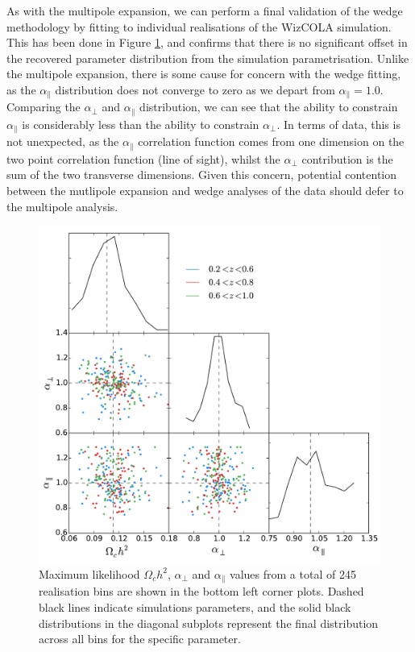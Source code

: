 \documentclass[titlesmallcaps, examinerscopy, copyrightpage]{uqthesis}
\begin{document}
As with the multipole expansion, we can perform a final validation of the wedge methodology by fitting to individual realisations of the WizCOLA simulation. This has been done in Figure \ref{fig:wdgDist2}, and confirms that there is no significant offset in the recovered parameter distribution from the simulation parametrisation. Unlike the multipole expansion, there is some cause for concern with the wedge fitting, as the $\alpha_\parallel$ distribution does not converge to zero as we depart from $\alpha_\parallel = 1.0$. Comparing the $\alpha_\perp$ and $\alpha_\parallel$ distribution, we can see that the ability to constrain $\alpha_\parallel$ is considerably less than the ability to constrain $\alpha_\perp$. In terms of data, this is not unexpected, as the $\alpha_\parallel$ correlation function comes from one dimension on the two point correlation function (line of sight), whilst the $\alpha_\perp$ contribution is the sum of the two transverse dimensions. Given this concern, potential contention between the mutlipole expansion and wedge analyses of the data should defer to the multipole analysis.


\begin{figure}[h!]
  \begin{center}
    \includegraphics[width=\textwidth]{images/wdgDist2.pdf}
  \end{center}
  \caption{Maximum likelihood $\Omega_c h^2$, $\alpha_\perp$ and $\alpha_\parallel$ values from a total of 245 realisation bins are shown in the bottom left corner plots. Dashed black lines indicate simulations parameters, and the solid black distributions in the diagonal subplots represent the final distribution across all bins for the specific parameter.}
  \label{fig:wdgDist2}
\end{figure}
\end{document}
